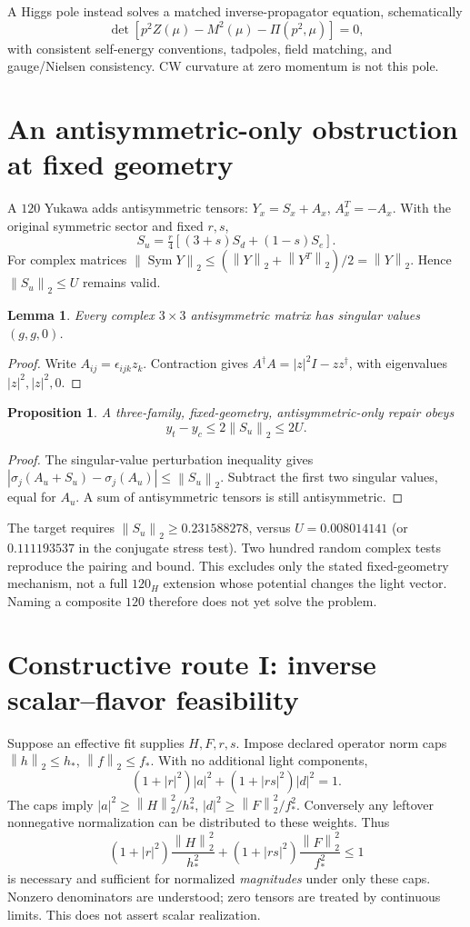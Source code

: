 \documentclass[11pt]{article}
\newcommand{\norm}[1]{\left\lVert#1\right\rVert_2}
\newcommand{\Sym}{\operatorname{Sym}}
\newtheorem{proposition}{Proposition}
\newtheorem{lemma}{Lemma}
\begin{document}
A Higgs pole instead solves a matched inverse-propagator equation,
schematically
\[
\det[p^2Z(\mu)-M^2(\mu)-\Pi(p^2,\mu)]=0,
\]
with consistent self-energy conventions, tadpoles, field matching, and
gauge/Nielsen consistency. CW curvature at zero momentum is not this pole.

\section{An antisymmetric-only obstruction at fixed geometry}
A $120$ Yukawa adds antisymmetric tensors:
$Y_x=S_x+A_x$, $A_x^T=-A_x$. With the original symmetric sector and
fixed $r,s$,
\[
S_u=\tfrac r4[(3+s)S_d+(1-s)S_e].
\]
For complex matrices $\norm{\Sym Y}\le(\norm Y+\norm{Y^T})/2=\norm Y$.
Hence $\norm{S_u}\le U$ remains valid.

\begin{lemma}
Every complex $3\times3$ antisymmetric matrix has singular values $(g,g,0)$.
\end{lemma}
\begin{proof}
Write $A_{ij}=\epsilon_{ijk}z_k$. Contraction gives
$A^\dagger A=|z|^2I-zz^\dagger$, with eigenvalues $|z|^2,|z|^2,0$.
\end{proof}
\begin{proposition}
A three-family, fixed-geometry, antisymmetric-only repair obeys
\begin{equation}
\boxed{y_t-y_c\le2\norm{S_u}\le2U.}
\label{eq:120}
\end{equation}
\end{proposition}
\begin{proof}
The singular-value perturbation inequality gives
$|\sigma_j(A_u+S_u)-\sigma_j(A_u)|\le\norm{S_u}$.
Subtract the first two singular values, equal for $A_u$.
A sum of antisymmetric tensors is still antisymmetric.
\end{proof}
The target requires $\norm{S_u}\ge0.231588278$, versus
$U=0.008014141$ (or $0.111193537$ in the conjugate stress test).
Two hundred random complex tests reproduce the pairing and bound.
This excludes only the stated fixed-geometry mechanism, not a full
$120_H$ extension whose potential changes the light vector.
Naming a composite $120$ therefore does not yet solve the problem.

\section{Constructive route I: inverse scalar--flavor feasibility}
Suppose an effective fit supplies $H,F,r,s$. Impose declared operator
norm caps $\norm h\le h_*$, $\norm f\le f_*$.
With no additional light components,
\[
(1+|r|^2)|a|^2+(1+|rs|^2)|d|^2=1.
\]
The caps imply $|a|^2\ge\norm H^2/h_*^2$,
$|d|^2\ge\norm F^2/f_*^2$. Conversely any leftover nonnegative
normalization can be distributed to these weights. Thus
\begin{equation}
\boxed{(1+|r|^2)\frac{\norm H^2}{h_*^2}
+(1+|rs|^2)\frac{\norm F^2}{f_*^2}\le1}
\label{eq:norm}
\end{equation}
is necessary and sufficient for normalized \emph{magnitudes} under
only these caps. Nonzero denominators are understood; zero tensors
are treated by continuous limits. This does not assert scalar realization.
\end{document}
